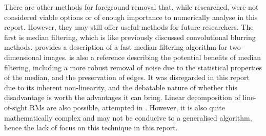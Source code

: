 There are other methods for foreground removal that, while researched, were not considered viable options or of enough importance to numerically analyse in this report. However, they may still offer useful methods for future researchers. The first is median filtering, which is like previously discussed convolutional blurring methods. \cite{ID39} provides a description of a fast median filtering algorithm for two-dimensional images. \cite{ID40} is also a reference describing the potential benefits of median filtering, including a more robust removal of noise due to the statistical properties of the median, and the preservation of edges. It was disregarded in this report due to its inherent non-linearity, and the debatable nature of whether this disadvantage is worth the advantages it can bring. Linear decomposition of line-of-sight RMs are also possible, attempted in \cite{ID21}. However, it is also quite mathematically complex and may not be conducive to a generalised algorithm, hence the lack of focus on this technique in this report.



